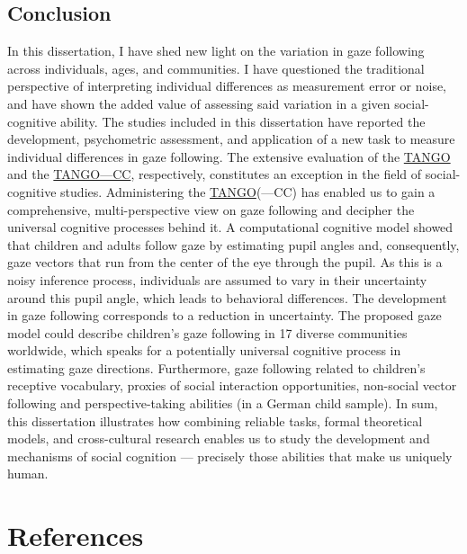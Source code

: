 \documentclass[
]{scrbook}
\begin{document}
\section{Conclusion}\label{conclusion}

In this dissertation, I have shed new light on the variation in gaze following across individuals, ages, and communities. I have questioned the traditional perspective of interpreting individual differences as measurement error or noise, and have shown the added value of assessing said variation in a given social-cognitive ability. The studies included in this dissertation have reported the development, psychometric assessment, and application of a new task to measure individual differences in gaze following. The extensive evaluation of the \hyperref[acronyms_TANGO]{TANGO} and the \hyperref[acronyms_TANGOux2014CC]{TANGO---CC}, respectively, constitutes an exception in the field of social-cognitive studies. Administering the \hyperref[acronyms_TANGO]{TANGO}(---CC) has enabled us to gain a comprehensive, multi-perspective view on gaze following and decipher the universal cognitive processes behind it. A computational cognitive model showed that children and adults follow gaze by estimating pupil angles and, consequently, gaze vectors that run from the center of the eye through the pupil. As this is a noisy inference process, individuals are assumed to vary in their uncertainty around this pupil angle, which leads to behavioral differences. The development in gaze following corresponds to a reduction in uncertainty. The proposed gaze model could describe children's gaze following in 17 diverse communities worldwide, which speaks for a potentially universal cognitive process in estimating gaze directions. Furthermore, gaze following related to children's receptive vocabulary, proxies of social interaction opportunities, non-social vector following and perspective-taking abilities (in a German child sample). In sum, this dissertation illustrates how combining reliable tasks, formal theoretical models, and cross-cultural research enables us to study the development and mechanisms of social cognition --- precisely those abilities that make us uniquely human.

\backmatter

\chapter{References}\label{references}
\end{document}
